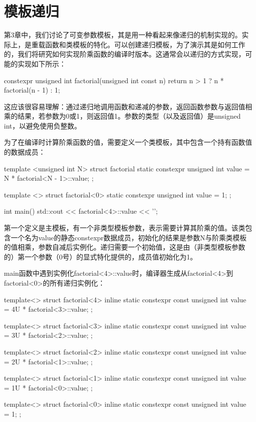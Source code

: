 \section{模板递归}
第3章中，我们讨论了可变参数模板，其是用一种看起来像递归的机制实现的。实际上，是重载函数和类模板的特化。可以创建递归模板，为了演示其是如何工作的，我们将研究如何实现阶乘函数的编译时版本。这通常会以递归的方式实现，可能的实现如下所示：

\begin{cppcode}
constexpr unsigned int factorial(unsigned int const n)
{
	return n > 1 ? n * factorial(n - 1) : 1;
}
\end{cppcode}

这应该很容易理解：通过递归地调用函数和递减的参数，返回函数参数与返回值相乘的结果，若参数为0或1，则返回值1。参数的类型（以及返回值）是unsigned int，以避免使用负整数。

为了在编译时计算阶乘函数的值，需要定义一个类模板，其中包含一个持有函数值的数据成员：

\begin{cppcode}
template <unsigned int N>
struct factorial
{
	static constexpr unsigned int value =
		N * factorial<N - 1>::value;
};

template <>
struct factorial<0>
{
	static constexpr unsigned int value = 1;
};

int main()
{
	std::cout << factorial<4>::value << '\n';
}
\end{cppcode}

第一个定义是主模板，有一个非类型模板参数，表示需要计算其阶乘的值。该类包含一个名为value的静态constexpr数据成员，初始化的结果是参数N与阶乘类模板的值相乘，参数自减后实例化。递归需要一个初始值，这是由（非类型模板参数的）第一个参数（0号）的显式特化提供的，成员值初始化为1。

main函数中遇到实例化factorial<4>::value时，编译器生成从factorial<4>到factorial<0>的所有递归实例化：

\begin{cppcode}
template<>
struct factorial<4>
{
	inline static constexpr const unsigned int value =
		4U * factorial<3>::value;
};

template<>
struct factorial<3>
{
	inline static constexpr const unsigned int value =
		3U * factorial<2>::value;
};

template<>
struct factorial<2>
{
	inline static constexpr const unsigned int value =
		2U * factorial<1>::value;
};

template<>
struct factorial<1>
{
	inline static constexpr const unsigned int value =
		1U * factorial<0>::value;
};

template<>
struct factorial<0>
{
	inline static constexpr const unsigned int value = 1;
};
\end{cppcode}

